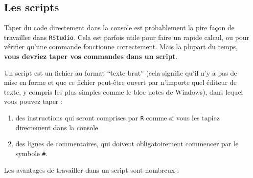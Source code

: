 \documentclass[
  a4paper,
  DIV=11,
  numbers=noendperiod,
  oneside]{scrreprt}
\providecommand{\tightlist}{%
  \setlength{\itemsep}{0pt}\setlength{\parskip}{0pt}}\usepackage{longtable,booktabs,array}
\begin{document}
\subsection{Les scripts}\label{sec-script}

Taper du code directement dans la console est probablement la pire façon
de travailler dans \texttt{RStudio}. Cela est parfois utile pour faire
un rapide calcul, ou pour vérifier qu'une commande fonctionne
correctement. Mais la plupart du temps, \textbf{vous devriez taper vos
commandes dans un script}.

\begin{tcolorbox}[enhanced jigsaw, coltitle=black, toprule=.15mm, opacityback=0, breakable, colback=white, opacitybacktitle=0.6, colframe=quarto-callout-important-color-frame, leftrule=.75mm, rightrule=.15mm, titlerule=0mm, bottomtitle=1mm, toptitle=1mm, arc=.35mm, title=\textcolor{quarto-callout-important-color}{\faExclamation}\hspace{0.5em}{Définition importante !}, colbacktitle=quarto-callout-important-color!10!white, bottomrule=.15mm, left=2mm]

Un script est un fichier au format ``texte brut'' (cela signifie qu'il
n'y a pas de mise en forme et que ce fichier peut-être ouvert par
n'importe quel éditeur de texte, y compris les plus simples comme le
bloc notes de Windows), dans lequel vous pouvez taper :

\begin{enumerate}
\def\labelenumi{\arabic{enumi}.}
\tightlist
\item
  des instructions qui seront comprises par \texttt{R} comme si vous les
  tapiez directement dans la console
\item
  des lignes de commentaires, qui doivent obligatoirement commencer par
  le symbole \texttt{\#}.
\end{enumerate}

\end{tcolorbox}

Les avantages de travailler dans un script sont nombreux :
\end{document}
